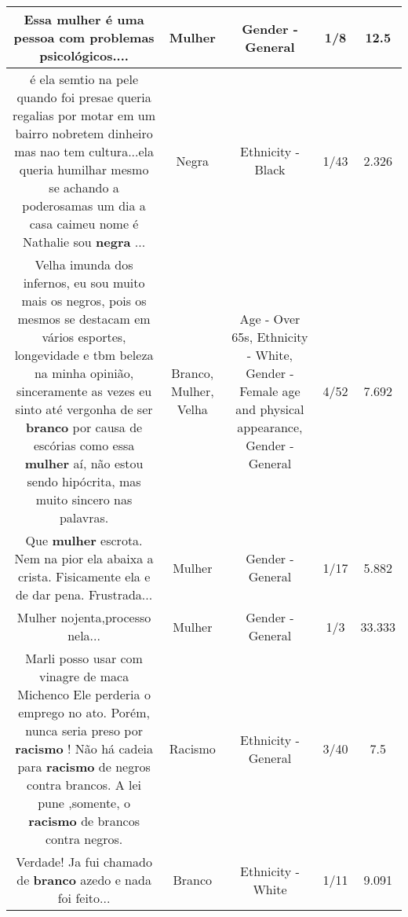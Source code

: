 \documentclass[11pt]{article}
\newlength\mylength
\begin{document}
\begin{center}
\begin{longtable}{|C{.65\mylength}|C{.30\mylength}|C{.12\mylength}|C{.12\mylength}|C{.12\mylength}|}
  \small Essa \textbf{mulher} é uma pessoa com problemas psicológicos....\normalsize   & Mulher & Gender - General & 1/8 & 12.5 \\  \hline
  \small é ela semtio na pele quando foi presae queria regalias por motar em um bairro nobretem dinheiro mas nao tem cultura...ela queria humilhar mesmo se achando a poderosamas um dia a casa caimeu nome é Nathalie sou \textbf{negra} ...\normalsize   & Negra & Ethnicity - Black & 1/43 & 2.326 \\  \hline
  \small Velha imunda dos infernos, eu sou muito mais os negros, pois os mesmos se destacam em vários esportes, longevidade e tbm beleza na minha opinião, sinceramente as vezes eu sinto até vergonha de ser \textbf{branco} por causa de escórias como essa \textbf{mulher} aí, não estou sendo hipócrita, mas muito sincero nas palavras.\normalsize   & Branco, Mulher, Velha & Age - Over 65s, Ethnicity - White, Gender - Female age and physical appearance, Gender - General & 4/52 & 7.692 \\  \hline
  \small Que \textbf{mulher} escrota. Nem na pior ela abaixa a crista. Fisicamente ela e de dar pena. Frustrada...\normalsize   & Mulher & Gender - General & 1/17 & 5.882 \\  \hline
  \small Mulher nojenta,processo nela...\normalsize   & Mulher & Gender - General & 1/3 & 33.333 \\  \hline
  \small Marli posso usar com vinagre de maca Michenco Ele perderia o emprego no ato. Porém,  nunca seria  preso por \textbf{racismo} ! Não há cadeia para \textbf{racismo} de negros contra brancos.  A lei pune ,somente, o \textbf{racismo} de brancos contra negros.\normalsize   & Racismo & Ethnicity - General & 3/40 & 7.5 \\  \hline
  \small Verdade! Ja fui chamado de \textbf{branco} azedo e nada foi feito...\normalsize   & Branco & Ethnicity - White & 1/11 & 9.091 \\  \hline

\end{longtable}
\end{center}
\end{document}
